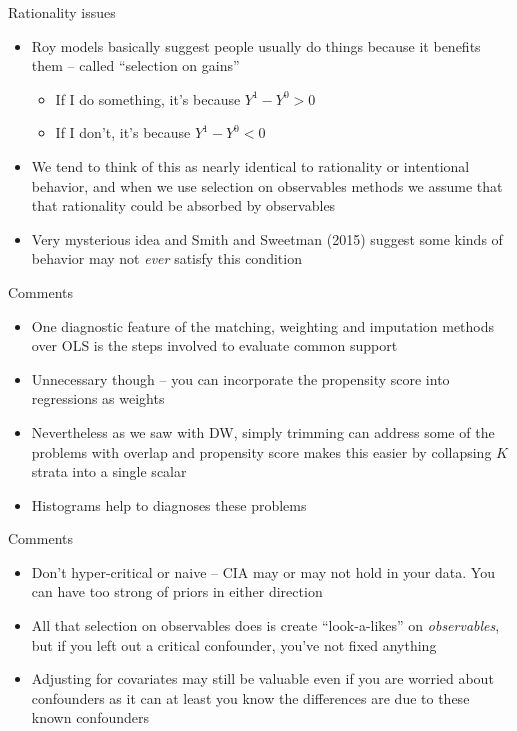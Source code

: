 \documentclass{beamer}
\begin{document}
\begin{frame}{Rationality issues}

\begin{itemize}
\item Roy models basically suggest people usually do things because it benefits them -- called ``selection on gains''
	\begin{itemize}
	\item If I do something, it's because $Y^1-Y^0>0$
	\item If I don't, it's because $Y^1-Y^0<0$
	\end{itemize}
\item We tend to think of this as nearly identical to rationality or intentional behavior, and when we use selection on observables methods we assume that that rationality could be absorbed by observables
\item Very mysterious idea and Smith and Sweetman (2015) suggest some kinds of behavior may not \emph{ever} satisfy this condition
\end{itemize}

\end{frame}



\begin{frame}{Comments}

\begin{itemize}

\item One diagnostic feature of the matching, weighting and imputation methods over OLS is the steps involved to evaluate common support
\item Unnecessary though -- you can incorporate the propensity score into regressions as weights
\item Nevertheless as we saw with DW, simply trimming can address some of the problems with overlap and propensity score makes this easier by collapsing $K$ strata into a single scalar
\item Histograms help to diagnoses these problems

\end{itemize}

\end{frame}

\begin{frame}{Comments}

\begin{itemize}

\item Don't hyper-critical or naive -- CIA may or may not hold in your data.  You can have too strong of priors in either direction
\item All that selection on observables does is create ``look-a-likes'' on \emph{observables}, but if you left out a critical confounder, you've not fixed anything
\item Adjusting for covariates may still be valuable even if you are worried about confounders as it can at least you know the differences are due to these known confounders

\end{itemize}

\end{frame}
\end{document}
